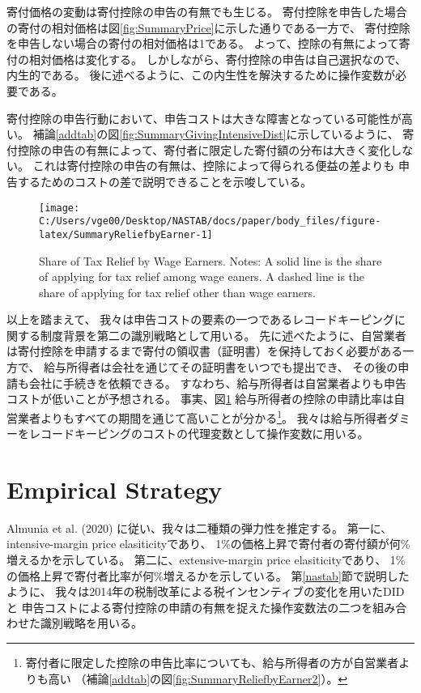 \documentclass[
  11pt,
  a4paper,
]{article}
\begin{document}
寄付価格の変動は寄付控除の申告の有無でも生じる。
寄付控除を申告した場合の寄付の相対価格は図\ref{fig:SummaryPrice}に示した通りである一方で、
寄付控除を申告しない場合の寄付の相対価格は1である。
よって、控除の有無によって寄付の相対価格は変化する。
しかしながら、寄付控除の申告は自己選択なので、内生的である。
後に述べるように、この内生性を解決するために操作変数が必要である。

寄付控除の申告行動において、申告コストは大きな障害となっている可能性が高い。
補論\ref{addtab}の図\ref{fig:SummaryGivingIntensiveDist}に示しているように、
寄付控除の申告の有無によって、寄付者に限定した寄付額の分布は大きく変化しない。
これは寄付控除の申告の有無は、控除によって得られる便益の差よりも
申告するためのコストの差で説明できることを示唆している。

\begin{figure}[t]

{\centering \texttt{[image: C:/Users/vge00/Desktop/NASTAB/docs/paper/body\_files/figure-latex/SummaryReliefbyEarner-1]} 

}

\caption{Share of Tax Relief by Wage Earners. Notes: A solid line is the share of applying for tax relief among wage eaners. A dashed line is the share of applying for tax relief other than wage earners.}\label{fig:SummaryReliefbyEarner}
\end{figure}

以上を踏まえて、
我々は申告コストの要素の一つであるレコードキーピングに関する制度背景を第二の識別戦略として用いる。
先に述べたように、自営業者は寄付控除を申請するまで寄付の領収書（証明書）を保持しておく必要がある一方で、
給与所得者は会社を通じてその証明書をいつでも提出でき、
その後の申請も会社に手続きを依頼できる。
すなわち、給与所得者は自営業者よりも申告コストが低いことが予想される。
事実、図\ref{fig:SummaryReliefbyEarner}
給与所得者の控除の申請比率は自営業者よりもすべての期間を通じて高いことが分かる\footnote{寄付者に限定した控除の申告比率についても、給与所得者の方が自営業者よりも高い
  （補論\ref{addtab}の図\ref{fig:SummaryReliefbyEarner2}）。}。
我々は給与所得者ダミーをレコードキーピングのコストの代理変数として操作変数に用いる。

\hypertarget{estimation}{%
\section{Empirical Strategy}\label{estimation}}

Almunia et al. (2020) に従い、我々は二種類の弾力性を推定する。
第一に、intensive-margin price elasiticityであり、
1\%の価格上昇で寄付者の寄付額が何\%増えるかを示している。
第二に、extensive-margin price elasiticityであり、
1\%の価格上昇で寄付者比率が何\%増えるかを示している。
第\ref{nastab}節で説明したように、
我々は2014年の税制改革による税インセンティブの変化を用いたDIDと
申告コストによる寄付控除の申請の有無を捉えた操作変数法の二つを組み合わせた識別戦略を用いる。
\end{document}
